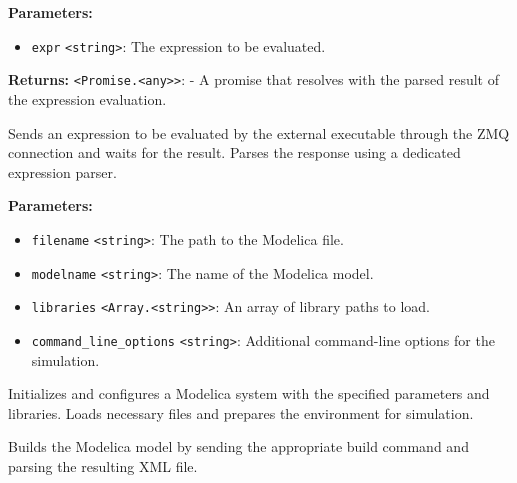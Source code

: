 \documentclass[12pt,a4paper]{article}
\begin{document}
\vspace{5mm}
\noindent {}


\noindent \textbf{Parameters:}
\begin{itemize}
  \item \texttt{expr} \texttt{<string>}: The expression to be evaluated.
\end{itemize}

\noindent \textbf{Returns:} \texttt{<Promise.<any>>}: - A promise that resolves with the parsed result of the expression evaluation.

\noindent Sends an expression to be evaluated by the external executable through the ZMQ connection and waits for the result.
Parses the response using a dedicated expression parser.

\vspace{5mm}
\noindent {}


\noindent \textbf{Parameters:}
\begin{itemize}
  \item \texttt{filename} \texttt{<string>}: The path to the Modelica file.
  \item \texttt{modelname} \texttt{<string>}: The name of the Modelica model.
  \item \texttt{libraries} \texttt{<Array.<string>>}: An array of library paths to load.
  \item \texttt{command\_line\_options} \texttt{<string>}: Additional command-line options for the simulation.
\end{itemize}

\noindent Initializes and configures a Modelica system with the specified parameters and libraries.
Loads necessary files and prepares the environment for simulation.

\vspace{5mm}
\noindent {}


\noindent Builds the Modelica model by sending the appropriate build command and parsing the resulting XML file.
\end{document}
